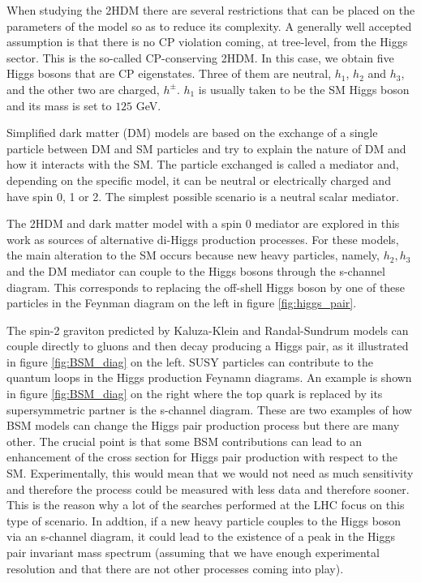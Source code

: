 When studying the 2HDM there are several restrictions that can be placed on the parameters of the model so as to reduce its complexity. A generally well accepted assumption is that there is no CP violation coming, at tree-level, from the Higgs sector. This is the so-called CP-conserving 2HDM. In this case, we obtain five Higgs bosons that are CP eigenstates. Three of them are neutral, $h_1$, $h_2$ and $h_3$, and the other two are charged, $h^{\pm}$. $h_1$ is usually taken to be the SM Higgs boson and its mass is set to $125$ GeV.

Simplified dark matter (DM) models are based on the exchange of a single particle between DM and SM particles and try to explain the nature of DM and how it interacts with the SM. The particle exchanged is called a mediator and, depending on the specific model, it can be neutral or electrically charged and have spin 0, 1 or 2. The simplest possible scenario is a neutral scalar mediator.

The 2HDM and dark matter model with a spin 0 mediator are explored in this work as sources of alternative di-Higgs production processes. For these models, the main alteration to the SM occurs because new heavy particles, namely, $h_2,h_3$ and the DM mediator can couple to the Higgs bosons through the s-channel diagram. This corresponds to replacing the off-shell Higgs boson by one of these particles in the Feynman diagram on the left in figure \ref{fig:higgs_pair}.

The spin-2 graviton predicted by Kaluza-Klein and Randal-Sundrum models can couple directly to gluons and then decay producing a Higgs pair, as it illustrated in figure \ref{fig:BSM_diag} on the left. SUSY particles can contribute to the quantum loops in the Higgs production Feynamn diagrams. An example is shown in figure \ref{fig:BSM_diag} on the right where the top quark is replaced by its supersymmetric partner is the s-channel diagram. These are two examples of how BSM models can change the Higgs pair production process but there are many other. The crucial point is that some BSM contributions can lead to an enhancement of the cross section for Higgs pair production with respect to the SM. Experimentally, this would mean that we would not need as much sensitivity and therefore the process could be measured with less data and therefore sooner. This is the reason why a lot of the searches performed at the LHC focus on this type of scenario. In addtion, if a new heavy particle couples to the Higgs boson via an s-channel diagram, it could lead to the existence of a peak in the Higgs pair invariant mass spectrum (assuming that we have enough experimental resolution and that there are not other processes coming into play). 

